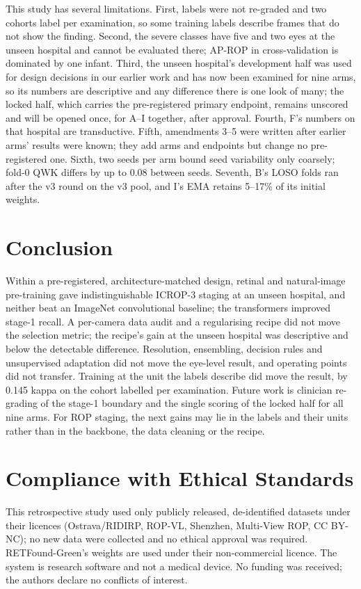\documentclass[conference]{IEEEtran}
\begin{document}
This study has several limitations. First, labels were not re-graded and two cohorts label per examination, so some training labels describe frames that do not show the finding. Second, the severe classes have five and two eyes at the unseen hospital and cannot be evaluated there; AP-ROP in cross-validation is dominated by one infant. Third, the unseen hospital's development half was used for design decisions in our earlier work and has now been examined for nine arms, so its numbers are descriptive and any difference there is one look of many; the locked half, which carries the pre-registered primary endpoint, remains unscored and will be opened once, for A--I together, after approval. Fourth, F's numbers on that hospital are transductive. Fifth, amendments 3--5 were written after earlier arms' results were known; they add arms and endpoints but change no pre-registered one. Sixth, two seeds per arm bound seed variability only coarsely; fold-0 QWK differs by up to 0.08 between seeds. Seventh, B's LOSO folds ran after the v3 round on the v3 pool, and I's EMA retains 5--17\% of its initial weights.

\section{Conclusion}
Within a pre-registered, architecture-matched design, retinal and natural-image pre-training gave indistinguishable ICROP-3 staging at an unseen hospital, and neither beat an ImageNet convolutional baseline; the transformers improved stage-1 recall. A per-camera data audit and a regularising recipe did not move the selection metric; the recipe's gain at the unseen hospital was descriptive and below the detectable difference. Resolution, ensembling, decision rules and unsupervised adaptation did not move the eye-level result, and operating points did not transfer. Training at the unit the labels describe did move the result, by 0.145 kappa on the cohort labelled per examination. Future work is clinician re-grading of the stage-1 boundary and the single scoring of the locked half for all nine arms. For ROP staging, the next gains may lie in the labels and their units rather than in the backbone, the data cleaning or the recipe.

\section*{Compliance with Ethical Standards}
This retrospective study used only publicly released, de-identified datasets under their licences (Ostrava/RIDIRP, ROP-VL, Shenzhen, Multi-View ROP, CC BY-NC); no new data were collected and no ethical approval was required. RETFound-Green's weights are used under their non-commercial licence. The system is research software and not a medical device. No funding was received; the authors declare no conflicts of interest.
\end{document}
